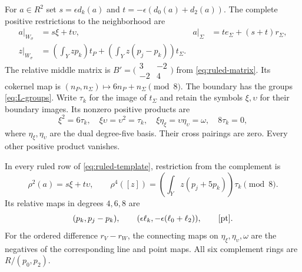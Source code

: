 For $a\in R^2$ set $s=\epsilon d_k(a)$ and
$t=-\epsilon(d_0(a)+d_2(a))$. The complete positive
restrictions to the neighborhood are
\begin{equation}\label{eq:ruled-restriction}
 \begin{aligned}
 a|_{W_\sigma}&=s\xi+t\upsilon,&
 a|_\Sigma&=t e_\Sigma+(s+t)r_\Sigma,\\
 z|_{W_\sigma}&=\left(\int_Yzp_k\right)t_P+
                   \left(\int_Yz(p_j-p_k)\right)t_\Sigma.
 \end{aligned}
\end{equation}
The relative middle matrix is
$B'=\bigl(\begin{smallmatrix}3&-2\\-2&4\end{smallmatrix}\bigr)$
from \eqref{eq:ruled-matrix}. Its cokernel map is
$(n_P,n_\Sigma)\mapsto6n_P+n_\Sigma\pmod8$.
The boundary has the groups \eqref{eq:L-groups}.
Write $\tau_k$ for the image of $t_\Sigma$ and retain the
symbols $\xi,\upsilon$ for their boundary images. Its nonzero
positive products are
\begin{equation}\label{eq:ruled-L}
 \xi^2=6\tau_k,\quad \xi\upsilon=\upsilon^2=\tau_k,
 \quad \xi \eta_\xi=\upsilon \eta_\upsilon=\omega,\quad8\tau_k=0,
\end{equation}
where $\eta_\xi,\eta_\upsilon$ are the dual degree-five basis.
Their cross pairings are zero. Every other positive product
vanishes.

\begin{proposition}\label{prop:all-attachments}
In every ruled row of \eqref{eq:ruled-template}, restriction
from the complement is
\begin{equation}\label{eq:ruled-rho}
 \rho^2(a)=s\xi+t\upsilon,\qquad
 \rho^4([z])=\left(\int_Yz(p_j+5p_k)\right)\tau_k\pmod8.
\end{equation}
Its relative maps in degrees $4,6,8$ are
\begin{equation}\label{eq:ruled-relative}
 (p_k,p_j-p_k),\qquad
 (\epsilon\ell_k,-\epsilon(\ell_0+\ell_2)),\qquad[\mathrm{pt}].
\end{equation}
For the ordered difference $r_V-r_W$, the connecting maps
on $\eta_\xi,\eta_\upsilon,\omega$ are the negatives of the
corresponding line and point maps. All six complement
rings are $R/(p_0,p_2)$.
\end{proposition}

